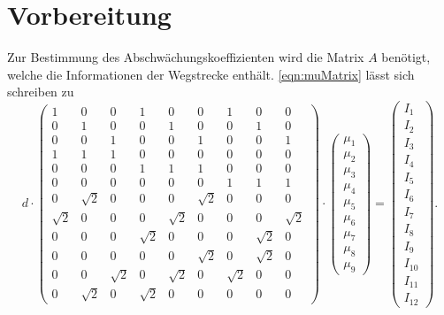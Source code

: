 \section{Vorbereitung}
\label{sec:Vorbereitung}
Zur Bestimmung des Abschwächungskoeffizienten wird die Matrix $A$ benötigt, welche die Informationen der Wegstrecke enthält. \autoref{eqn:muMatrix} lässt sich schreiben zu
\begin{equation}
    d \cdot
    \begin{pmatrix}
        1 & 0 & 0 & 1 & 0 & 0 & 1 & 0 & 0 \\
        0 & 1 & 0 & 0 & 1 & 0 & 0 & 1 & 0 \\
        0 & 0 & 1 & 0 & 0 & 1 & 0 & 0 & 1 \\
        1 & 1 & 1 & 0 & 0 & 0 & 0 & 0 & 0 \\
        0 & 0 & 0 & 1 & 1 & 1 & 0 & 0 & 0 \\
        0 & 0 & 0 & 0 & 0 & 0 & 1 & 1 & 1 \\
        0 & \sqrt{2} & 0 & 0 & 0 & \sqrt{2} & 0 & 0 & 0 \\
        \sqrt{2} & 0 & 0 & 0 & \sqrt{2} & 0 & 0 & 0 & \sqrt{2} \\
        0 & 0 & 0 & \sqrt{2} & 0 & 0 & 0 & \sqrt{2} & 0 \\
        0 & 0 & 0 & 0 & 0 & \sqrt{2} & 0 & \sqrt{2} & 0 \\
        0 & 0 & \sqrt{2} & 0 & \sqrt{2} & 0 & \sqrt{2} & 0 & 0 \\
        0 & \sqrt{2} & 0 & \sqrt{2} & 0 & 0 & 0 & 0 & 0 
    \end{pmatrix}
    \cdot
    \begin{pmatrix}
        \mu_1 \\
        \mu_2 \\
        \mu_3 \\
        \mu_4 \\
        \mu_5 \\
        \mu_6 \\
        \mu_7 \\
        \mu_8 \\
        \mu_9 
    \end{pmatrix}
    =
    \begin{pmatrix}
        I_1 \\
        I_2 \\
        I_3 \\
        I_4 \\
        I_5 \\
        I_6 \\
        I_7 \\
        I_8 \\
        I_9 \\
        I_{10} \\
        I_{11} \\
        I_{12} 
    \end{pmatrix}
    .
\end{equation}

